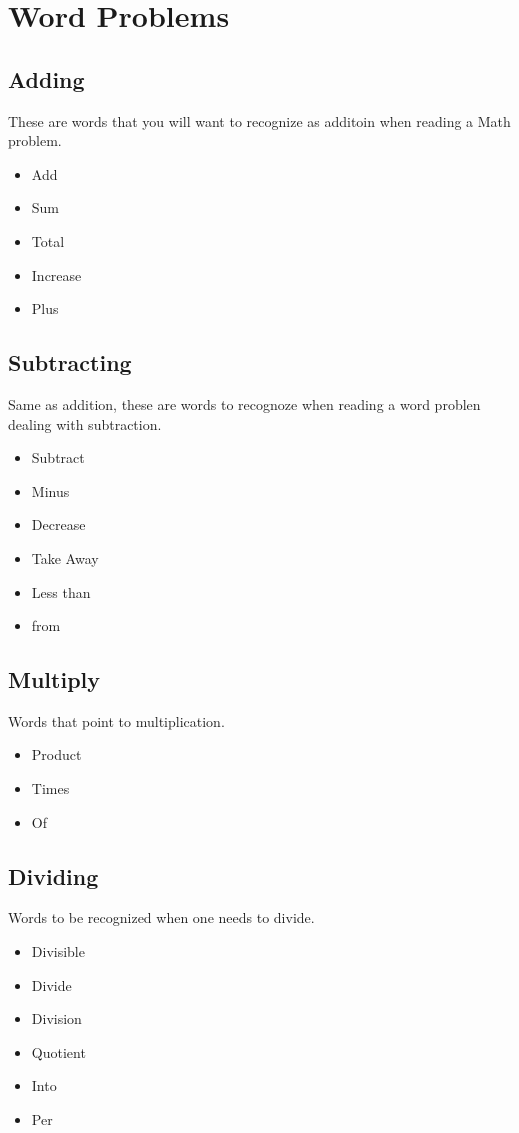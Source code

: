\documentclass[]{article}
\begin{document}
\section{Word Problems}
\subsection{Adding}
These are words that you will want to recognize as additoin when reading a Math problem.
\begin{itemize}
\item Add
\item Sum
\item Total
\item Increase
\item Plus
\end{itemize}

\subsection{Subtracting}
Same as addition, these are words to recognoze when reading a word problen dealing with subtraction.
\begin{itemize}
	\item Subtract
	\item Minus
	\item Decrease
	\item Take Away
	\item Less than
	\item from
\end{itemize}

\subsection{Multiply}
Words that point to multiplication. 
\begin{itemize}
	\item Product
	\item Times 
	\item Of	
\end{itemize}
\subsection{Dividing}
Words to be recognized when one needs to divide. 
\begin{itemize}
	\item Divisible
	\item Divide
	\item Division
	\item Quotient
	\item Into
	\item Per
\end{itemize}
\end{document}
